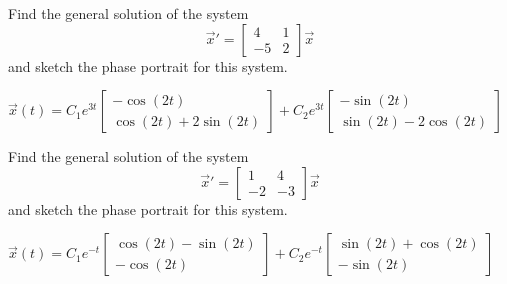 \begin{exercise}%
Find the general solution of the system
\begin{equation*}
{\vec{x}}' = \begin{bmatrix} 4 & 1 \\ -5 & 2 \end{bmatrix} \vec{x}
\end{equation*}
and sketch the phase portrait for this system.
\end{exercise}
\comboSol{%
}
{%
$\vec{x}(t) = C_1e^{3t} \left[\begin{smallmatrix} -\cos(2t) \\ \cos(2t) + 2\sin(2t) \end{smallmatrix}\right] + C_2e^{3t}\left[\begin{smallmatrix} -\sin(2t) \\ \sin(2t) - 2 \cos(2t) \end{smallmatrix}\right]$ \hfill{}\hfill\hfill
}


\begin{exercise}%
Find the general solution of the system
\begin{equation*}
{\vec{x}}' = \begin{bmatrix} 1 & 4 \\ -2 & -3 \end{bmatrix} \vec{x}
\end{equation*}
and sketch the phase portrait for this system.
\end{exercise}
\comboSol{%
}
{%
$\vec{x}(t) = C_1e^{-t}\left[\begin{smallmatrix} \cos(2t) - \sin(2t) \\ -\cos(2t) \end{smallmatrix}\right] + C_2e^{-t}\left[\begin{smallmatrix} \sin(2t) + \cos(2t) \\ -\sin(2t) \end{smallmatrix}\right]$ \hfill{}\hfill\hfill
}

